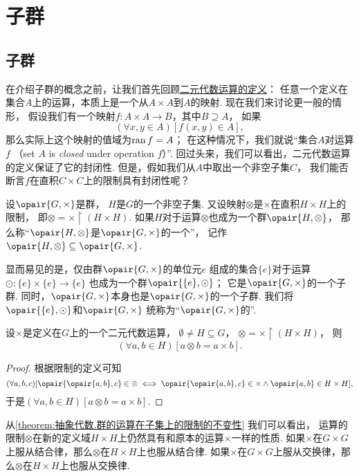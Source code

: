 \section{子群}
\subsection{子群}
在介绍子群的概念之前，让我们首先回顾\hyperref[definition:集合论.二元代数运算]{二元代数运算的定义}：
任意一个定义在集合\(A\)上的运算，本质上是一个从\(A \times A\)到\(A\)的映射.
现在我们来讨论更一般的情形，
假设我们有一个映射\(f\colon A \times A \to B\)，其中\(B \supseteq A\)，
如果\[
	(\forall x,y \in A)[f(x,y) \in A],
\]
那么实际上这个映射的值域为\(\operatorname{ran} f = A\)；
在这种情况下，我们就说“集合\(A\)对运算\(f\) %
（set \(A\) is \emph{closed} under operation \(f\)）”.
回过头来，我们可以看出，二元代数运算的定义保证了它的封闭性.
但是，假如我们从\(A\)中取出一个非空子集\(C\)，
我们能否断言\(f\)在直积\(C \times C\)上的限制具有封闭性呢？

\begin{definition}
设\(\opair{G,\times}\)是群，
\(H\)是\(G\)的一个非空子集.
又设映射\(\otimes\)是\(\times\)在直积\(H \times H\)上的限制，
即\(\otimes = \times \upharpoonright(H \times H)\).
如果\(H\)对于运算\(\otimes\)也成为一个群\(\opair{H,\otimes}\)，
那么称“\(\opair{H,\otimes}\)是\(\opair{G,\times}\)的一个”，
记作\(\opair{H,\otimes} \subseteq \opair{G,\times}\).
\end{definition}

显而易见的是，仅由群\(\opair{G,\times}\)的单位元\(e\)%
组成的集合\(\{e\}\)对于运算\(\odot\colon \{e\}\times\{e\}\to\{e\}\)%
也成为一个群\(\opair{\{e\},\odot}\)；
它是\(\opair{G,\times}\)的一个子群.
同时，\(\opair{G,\times}\)本身也是\(\opair{G,\times}\)的一个子群.
我们将\(\opair{\{e\},\odot}\)和\(\opair{G,\times}\)%
统称为“\(\opair{G,\times}\)的”.

\begin{lemma}\label{theorem:抽象代数.群的运算在子集上的限制的不变性}
设\(\times\)是定义在\(G\)上的一个二元代数运算，
\(\emptyset \neq H \subseteq G\)，
\(\otimes = \times \upharpoonright(H \times H)\)，
则\[
	(\forall a,b \in H)[a \otimes b = a \times b].
\]
\begin{proof}
根据限制的定义可知\[
	(\forall a,b,c)[
		\opair{\opair{a,b},c} \in \otimes
		\iff
		\opair{\opair{a,b},c} \in \times
		\land
		\opair{a,b} \in H \times H
	],
\]
于是\((\forall a,b \in H)[a \otimes b = a \times b]\).
\end{proof}
\end{lemma}
从\cref{theorem:抽象代数.群的运算在子集上的限制的不变性} 我们可以看出，
运算的限制\(\otimes\)在新的定义域\(H \times H\)上仍然具有和原本的运算\(\times\)一样的性质.
如果\(\times\)在\(G \times G\)上服从结合律，那么\(\otimes\)在\(H \times H\)上也服从结合律.
如果\(\times\)在\(G \times G\)上服从交换律，那么\(\otimes\)在\(H \times H\)上也服从交换律.

